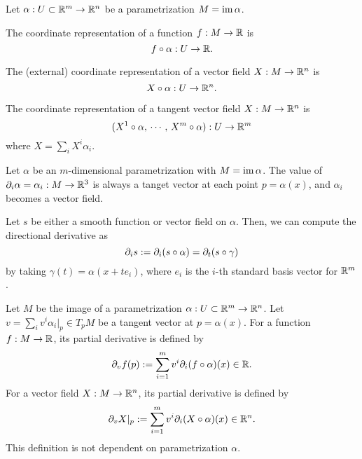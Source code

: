 \documentclass{../../large}
\renewcommand{\a}{\alpha}
\begin{document}
\begin{prb}
Let $\a:U\subset\R^m\to\R^n$ be a parametrization $M=\im\a$.
\begin{parts}
\item The coordinate representation of a function $f:M\to\mathbb{R}$ is
\[f\circ\a:U\to\R.\]
\item The (external) coordinate representation of a vector field $X:M\to\mathbb{R}^n$ is
\[X\circ\a:U\to\R^n.\]
\item The coordinate representation of a tangent vector field $X:M\to\mathbb{R}^n$ is
\[(X^1\circ\a,\,\cdots,\,X^m\circ\a):U\to\R^m\]
where $X=\sum_iX^i\a_i$.
\end{parts}
\end{prb}

\begin{prb}
Let $\a$ be an $m$-dimensional parametrization with $M=\im\a$.
The value of $\pd_i\a=\a_i:M\to\R^3$ is always a tanget vector at each point $p=\a(x)$, and $\a_i$ becomes a vector field.

Let $s$ be either a smooth function or vector field on $\a$.
Then, we can compute the directional derivative as
\[\pd_is:=\pd_i(s\circ\a)=\pd_t(s\circ\gamma)\]
by taking $\gamma(t)=\a(x+te_i)$, where $e_i$ is the $i$-th standard basis vector for $\mathbb{R}^m$.
\end{prb}

\begin{prb}
Let $M$ be the image of a parametrization $\a:U\subset\R^m\to\R^n$.
Let $v=\sum_iv^i\a_i|_p\in T_pM$ be a tangent vector at $p=\a(x)$.
For a function $f:M\to\mathbb{R}$, its partial derivative is defined by
\[\pd_vf(p):=\sum_{i=1}^mv^i\pd_i(f\circ\a)(x)\in\R.\]
For a vector field $X:M\to\mathbb{R}^n$, its partial derivative is defined by
\[\pd_vX|_p:=\sum_{i=1}^mv^i\pd_i(X\circ\a)(x)\in\R^n.\]
This definition is not dependent on parametrization $\a$.
\end{prb}
\end{document}
